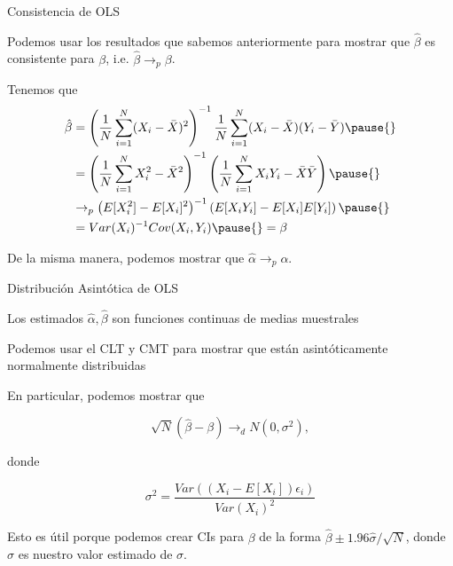 \documentclass[11pt,handout,aspectratio=169]{beamer}
\newenvironment{wideitemize}{\itemize\addtolength{\itemsep}{10pt}}{\enditemize}
\begin{document}
%

\begin{frame}{Consistencia de OLS}
\begin{wideitemize}
\item
Podemos usar los resultados que sabemos anteriormente para mostrar que $\hat\beta$ es consistente para $\beta$, i.e. $\hat\beta \rightarrow_p \beta$.

\pause
\item
Tenemos que
\begin{align*}
 \hat\beta &=\left( \frac{1}{N} \sum_{i=1}^N (X_i - \bar{X})^2 \right)^{-1}   \frac{1}{N} \sum_{i=1}^{N} (X_i - \bar{X})(Y_i - \bar{Y}) \pause{}  \\
 &= \left( \frac{1}{N} \sum_{i=1}^N X_i^2 - \bar{X}^2 \right)^{-1}   \left( \frac{1}{N} \sum_{i=1}^{N} X_i Y_i - \bar{X} \bar{Y} \right) \pause{} \\
 & \rightarrow_p \left( E[X_i^2] - E[X_i]^2 \right)^{-1}   \left( E[X_i Y_i] - E[X_i] E[Y_i] \right) \pause{} \\
 &= Var(X_i)^{-1} Cov(X_i, Y_i) \pause{} = \beta
\end{align*}


\pause
\item
De la misma manera, podemos mostrar que $\hat\alpha \rightarrow_p \alpha$.
\end{wideitemize}		
\end{frame}


\begin{frame}{Distribución Asintótica de OLS}
	\begin{wideitemize}
	\item
	Los estimados $\hat\alpha, \hat\beta$ son funciones continuas de medias muestrales
	
	\pause
	\item
	Podemos usar el CLT y CMT para mostrar que están asintóticamente normalmente distribuidas	
	\pause
	\item
	En particular, podemos mostrar que
	
		$$\sqrt{N}(\hat\beta - \beta) \rightarrow_d N(0, \sigma^2),$$
	
	\noindent donde
	
	$$\sigma^2 = \dfrac{  Var((X_i - E[X_i])\epsilon_i) }{ Var(X_i)^2  }$$ 
	
	
	\pause
	\item
	Esto es útil porque podemos crear CIs para $\beta$ de la forma $\hat\beta 	\pm 1.96 \hat\sigma / \sqrt{N}$, donde $\hat\sigma$ es nuestro valor estimado de $\sigma$. 
	
	\end{wideitemize}	
\end{frame}
\end{document}

